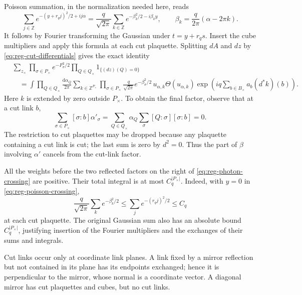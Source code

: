 \documentclass[11pt,letterpaper,reqno]{amsart}
\newcommand{\Z}{\mathbb Z}
\newcommand{\dd}{\mathrm d}
\begin{document}
Poisson summation, in the normalization needed here, reads
\begin{equation}\label{eq:reg-poisson-crossing}
 \sum_{j\in\Z}e^{-(y+r_qj)^2/2+ij\alpha}
 =\frac{q}{\sqrt{2\pi}}\sum_{k\in\Z}
          e^{-\beta_k^2/2-i\beta_ky},
 \qquad\beta_k=\frac{q}{2\pi}(\alpha-2\pi k).
\end{equation}
It follows by Fourier transforming the Gaussian under
$t=y+r_qs$. Insert the cube multipliers and apply this formula at
each cut plaquette. Splitting $dA$ and $dz$ by
\eqref{eq:reg-cut-differentials} gives the exact identity
\begin{align}\label{eq:reg-photon-crossing}
 &\sum_{z_\times}
       \prod_{\sigma\in P_\times}e^{-F_\sigma^2/2}
       \prod_{Q\in Q_\times}1_{\{(dz)(Q)=0\}}
 \nonumber\\
 &\quad=\int\prod_{Q\in Q_\times}\frac{\dd\alpha_Q}{2\pi}
       \sum_{k\in\Z^{P_\times}}
       \prod_{\sigma\in P_\times}
               \frac{q}{\sqrt{2\pi}}e^{-\beta_\sigma^2/2}\,
       u_{\alpha,k}\Theta(u_{\alpha,k})
       \exp\left(iq\sum_{b\in B_\times}a_b(d^*k)(b)\right).
\end{align}
Here $k$ is extended by zero outside $P_\times$. To obtain the final
factor, observe that at a cut link $b$,
\[
 \sum_{\sigma\in P_\times}[\sigma:b]\alpha'_\sigma
 =\sum_{Q\in Q_\times}\alpha_Q
                    \sum_\sigma[Q:\sigma][\sigma:b]=0.
\]
The restriction to cut plaquettes may be dropped because any
plaquette containing a cut link is cut; the last sum is zero by
$d^2=0$. Thus the part of $\beta$ involving $\alpha'$ cancels from
the cut-link factor.

All the weights before the two reflected factors on the right of
\eqref{eq:reg-photon-crossing} are positive. Their total integral is
at most $C_q^{|P_\times|}$. Indeed, with $y=0$ in
\eqref{eq:reg-poisson-crossing},
\[
 \frac{q}{\sqrt{2\pi}}\sum_k e^{-\beta_k^2/2}
 \le\sum_j e^{-(r_qj)^2/2}\le C_q
\]
at each cut plaquette. The original Gaussian sum also has an
absolute bound $C_q^{|P_\times|}$, justifying insertion of the
Fourier multipliers and the exchanges of their sums and integrals.

Cut links occur only at coordinate link planes. A link fixed by a
mirror reflection but not contained in its plane has its endpoints
exchanged; hence it is perpendicular to the mirror, whose normal
is a coordinate vector. A diagonal mirror has cut plaquettes and
cubes, but no cut links.
\end{document}
